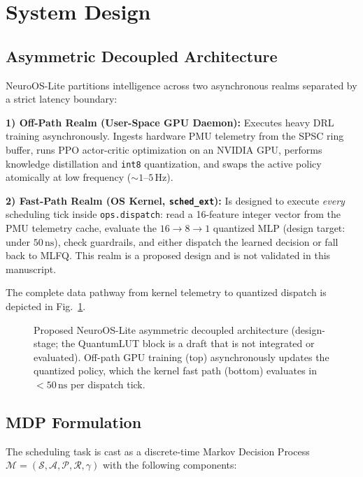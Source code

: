 \section{System Design}
\label{sec:design}

\subsection{Asymmetric Decoupled Architecture}

NeuroOS-Lite partitions intelligence across two asynchronous realms separated
by a strict latency boundary:

\smallskip
\noindent\textbf{1) Off-Path Realm (User-Space GPU Daemon):} Executes heavy DRL training
asynchronously. Ingests hardware PMU telemetry from the SPSC ring buffer,
runs PPO actor-critic optimization on an NVIDIA GPU, performs
knowledge distillation and \texttt{int8} quantization, and swaps the
active policy atomically at low frequency ($\sim 1\text{--}5\,\text{Hz}$).

\smallskip
\noindent\textbf{2) Fast-Path Realm (OS Kernel, \texttt{sched\_ext}):} Is designed to execute
\emph{every} scheduling tick inside \texttt{ops.dispatch}: read a
16-feature integer vector from the PMU telemetry cache, evaluate the
$16\to 8\to 1$ quantized MLP (design target: under $50\,\text{ns}$), check
guardrails, and either dispatch the learned decision or fall back to
MLFQ. This realm is a proposed design and is not validated in this manuscript.

\smallskip
The complete data pathway from kernel telemetry to quantized dispatch is depicted in Fig.~\ref{fig:arch}.

\begin{figure}[t]
  \centering
  \caption{Proposed NeuroOS-Lite asymmetric decoupled architecture (design-stage; the
    QuantumLUT block is a draft that is not integrated or evaluated). Off-path GPU training
    (top) asynchronously updates the quantized policy, which the kernel fast
    path (bottom) evaluates in $<50\,\text{ns}$ per dispatch tick.}
  \label{fig:arch}
\end{figure}

\subsection{MDP Formulation}
\label{subsec:mdp}

The scheduling task is cast as a discrete-time Markov Decision Process
$\mathcal{M} = (\mathcal{S}, \mathcal{A}, \mathcal{P}, \mathcal{R}, \gamma)$
with the following components:

